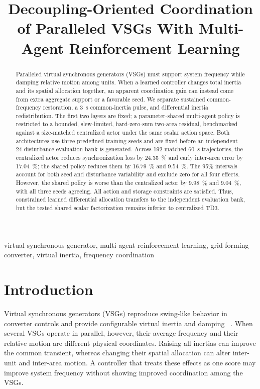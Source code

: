 \documentclass[conference,a4paper]{IEEEtran}
\title{Decoupling-Oriented Coordination of Paralleled VSGs With
Multi-Agent Reinforcement Learning}
\author{
\IEEEauthorblockN{Yuang Wei, Yixiao Wang, and Zhuang Xu}
\IEEEauthorblockA{
Department of Electrical and Electronic Engineering\\
University of Nottingham Ningbo China, Ningbo, China\\
John.XU@nottingham.edu.cn}
}
\begin{document}
\pagestyle{empty}
\maketitle

\begin{abstract}
Paralleled virtual synchronous generators (VSGs) must support system frequency
while damping relative motion among units. When a learned controller changes
total inertia and its spatial allocation together, an apparent coordination
gain can instead come from extra aggregate support or a favorable seed. We
separate sustained common-frequency restoration, a \SI{3}{s} common-inertia
pulse, and differential inertia redistribution. The first two layers are fixed;
a parameter-shared multi-agent policy is restricted to a bounded, slew-limited,
hard-zero-sum two-area residual, benchmarked against a size-matched centralized
actor under the same scalar action space. Both
architectures use three predefined training seeds and are fixed before an
independent 24-disturbance evaluation bank is generated.
Across 192 matched \SI{60}{s} trajectories, the centralized actor reduces
synchronization loss by \SI{24.35}{\percent} and early inter-area error by
\SI{17.04}{\percent}; the shared policy reduces them by
\SI{16.79}{\percent} and \SI{9.54}{\percent}. The 95\% intervals account for
both seed and disturbance variability and exclude zero for all four effects.
However, the shared policy is worse than the centralized actor by
\SI{9.98}{\percent} and \SI{9.04}{\percent}, with all three seeds
agreeing. All action and storage constraints are satisfied. Thus, constrained
learned differential allocation transfers to the independent evaluation bank,
but the tested shared scalar factorization remains inferior to centralized TD3.
\end{abstract}

\begin{IEEEkeywords}
virtual synchronous generator, multi-agent reinforcement learning,
grid-forming converter, virtual inertia, frequency coordination
\end{IEEEkeywords}

\section{Introduction}

Virtual synchronous generators (VSGs) reproduce swing-like behavior in
converter controls and provide configurable virtual inertia and damping
~\cite{zhong2011synchronverters,darco2013vsm}. When several VSGs operate in
parallel, however, their average frequency and their relative motion are
different physical coordinates. Raising all inertias can improve the common
transient, whereas changing their spatial allocation can alter inter-unit and
inter-area motion. A controller that treats these effects as one score may
improve system frequency without showing improved coordination among the VSGs.
\end{document}
